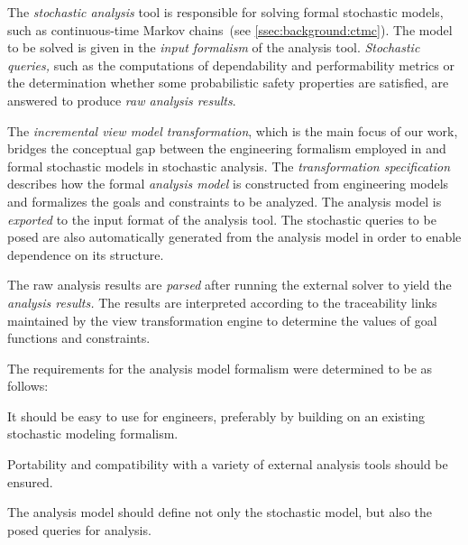 The \emph{stochastic analysis} tool is responsible for solving formal stochastic models, such as continuous-time Markov chains~(see \vref{ssec:background:ctmc}). The model to be solved is given in the \emph{input formalism} of the analysis tool. \emph{Stochastic queries,} such as the computations of dependability and performability metrics or the determination whether some probabilistic safety properties are satisfied, are answered to produce \emph{raw analysis results}. 

The \emph{incremental view model transformation}, which is the main focus of our work, bridges the conceptual gap between the engineering formalism employed in  and formal stochastic models in stochastic analysis. The \emph{transformation specification} describes how the formal \emph{analysis model} is constructed from engineering models and formalizes the goals and constraints to be analyzed. The analysis model is \emph{exported} to the input format of the analysis tool. The stochastic queries to be posed are also automatically generated from the analysis model in order to enable dependence on its structure.

The raw analysis results are \emph{parsed} after running the external solver to yield the \emph{analysis results.} The results are interpreted according to the traceability links maintained by the view transformation engine to determine the values of goal functions and constraints.

The requirements for the analysis model formalism were determined to be as follows:
\begin{enumerate*}
\item It should be easy to use for engineers, preferably by building on an existing stochastic modeling formalism.
\item Portability and compatibility with a variety of external analysis tools should be ensured.
\item The analysis model should define not only the stochastic model, but also the posed queries for analysis.
\end{enumerate*}

